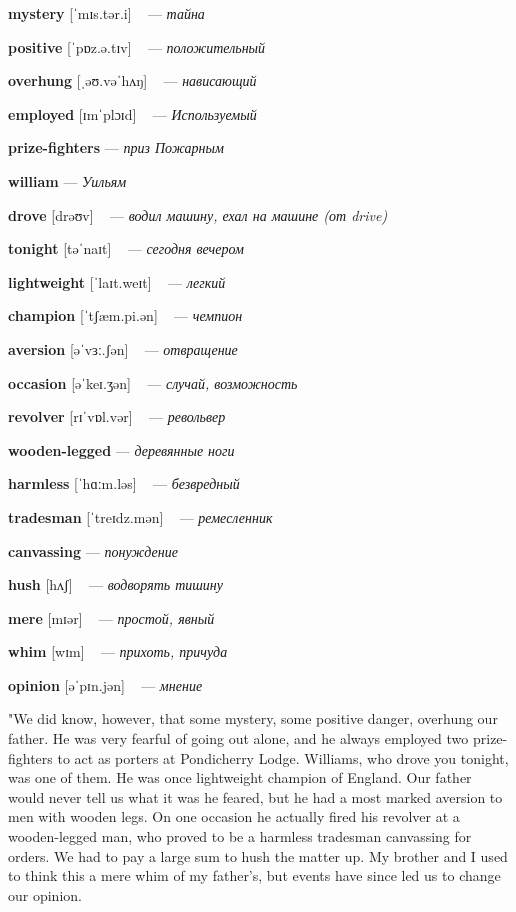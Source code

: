 \documentclass[a4paper,oneside,12pt]{amsart}
\begin{document}
{\large 

 {\bf mystery } [ˈmɪs.tər.i] ~ --- \emph{ тайна }

{\bf positive } [ˈpɒz.ə.tɪv] ~ --- \emph{ положительный }

{\bf overhung } [ˌəʊ.vəˈhʌŋ] ~ --- \emph{ нависающий }

{\bf employed } [ɪmˈplɔɪd] ~ --- \emph{ Используемый }

{\bf prize-fighters } --- \emph{ приз Пожарным }

{\bf william } --- \emph{ Уильям }

{\bf drove } [drəʊv] ~ --- \emph{ водил машину, ехал на машине (от drive) }

{\bf tonight } [təˈnaɪt] ~ --- \emph{ сегодня вечером }

{\bf lightweight } [ˈlaɪt.weɪt] ~ --- \emph{ легкий }

{\bf champion } [ˈtʃæm.pi.ən] ~ --- \emph{ чемпион }

{\bf aversion } [əˈvɜː.ʃən] ~ --- \emph{ отвращение }

{\bf occasion } [əˈkeɪ.ʒən] ~ --- \emph{ случай, возможность }

{\bf revolver } [rɪˈvɒl.vər] ~ --- \emph{ револьвер }

{\bf wooden-legged } --- \emph{ деревянные ноги }

{\bf harmless } [ˈhɑːm.ləs] ~ --- \emph{ безвредный }

{\bf tradesman } [ˈtreɪdz.mən] ~ --- \emph{ ремесленник }

{\bf canvassing } --- \emph{ понуждение }

{\bf hush } [hʌʃ] ~ --- \emph{ водворять тишину }

{\bf mere } [mɪər] ~ --- \emph{ простой, явный }

{\bf whim } [wɪm] ~ --- \emph{ прихоть, причуда }

{\bf opinion } [əˈpɪn.jən] ~ --- \emph{ мнение }

} \vspace{6mm} {\Large 

 
"We did know, however, that some mystery, some positive danger, overhung our father. He was very fearful of going out alone, and he always employed two prize-fighters to act as porters at Pondicherry Lodge. Williams, who drove you tonight, was one of them. He was once lightweight champion of England. Our father would never tell us what it was he feared, but he had a most marked aversion to men with wooden legs. On one occasion he actually fired his revolver at a wooden-legged man, who proved to be a harmless tradesman canvassing for orders. We had to pay a large sum to hush the matter up. My brother and I used to think this a mere whim of my father's, but events have since led us to change our opinion.
\\ } 
\end{document}
